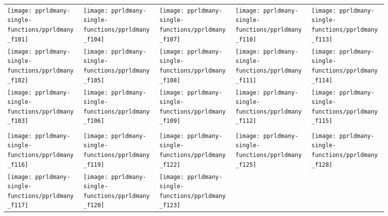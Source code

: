\documentclass[sigconf]{acmart}
\begin{document}
{%
\begin{figure*}
\centering
\begin{tabular}{l@{\hspace*{-0.01\textwidth}}l@{\hspace*{-0.01\textwidth}}l@{\hspace*{-0.01\textwidth}}l@{\hspace*{-0.01\textwidth}}l@{\hspace*{-0.01\textwidth}}}
\texttt{[image: pprldmany-single-functions/pprldmany\_f101]}&
\texttt{[image: pprldmany-single-functions/pprldmany\_f104]}&
\texttt{[image: pprldmany-single-functions/pprldmany\_f107]}&
\texttt{[image: pprldmany-single-functions/pprldmany\_f110]}&
\texttt{[image: pprldmany-single-functions/pprldmany\_f113]}\\
\texttt{[image: pprldmany-single-functions/pprldmany\_f102]}&
\texttt{[image: pprldmany-single-functions/pprldmany\_f105]}&
\texttt{[image: pprldmany-single-functions/pprldmany\_f108]}&
\texttt{[image: pprldmany-single-functions/pprldmany\_f111]}&
\texttt{[image: pprldmany-single-functions/pprldmany\_f114]}\\
\texttt{[image: pprldmany-single-functions/pprldmany\_f103]}&
\texttt{[image: pprldmany-single-functions/pprldmany\_f106]}&
\texttt{[image: pprldmany-single-functions/pprldmany\_f109]}&
\texttt{[image: pprldmany-single-functions/pprldmany\_f112]}&
\texttt{[image: pprldmany-single-functions/pprldmany\_f115]}\\\hline\\
\texttt{[image: pprldmany-single-functions/pprldmany\_f116]}&
\texttt{[image: pprldmany-single-functions/pprldmany\_f119]}&
\texttt{[image: pprldmany-single-functions/pprldmany\_f122]}&
\texttt{[image: pprldmany-single-functions/pprldmany\_f125]}&
\texttt{[image: pprldmany-single-functions/pprldmany\_f128]}\\
\texttt{[image: pprldmany-single-functions/pprldmany\_f117]}&
\texttt{[image: pprldmany-single-functions/pprldmany\_f120]}&
\texttt{[image: pprldmany-single-functions/pprldmany\_f123]}&

\end{tabular}
\end{figure*}}
\end{document}
